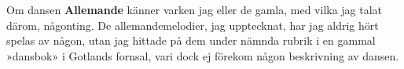 \vspace{0.7cm}
Om dansen \textbf{Allemande} känner varken jag eller de gamla,
med vilka jag talat därom, någonting. De allemandemelodier,
jag upptecknat, har jag aldrig hört spelas av någon, utan jag hittade på dem under nämnda rubrik i en gammal »dansbok» i Gotlands fornsal, vari dock ej förekom någon beskrivning av dansen.
\vspace{0.2cm}
